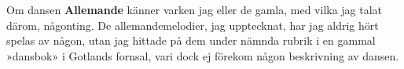 \vspace{0.7cm}
Om dansen \textbf{Allemande} känner varken jag eller de gamla,
med vilka jag talat därom, någonting. De allemandemelodier,
jag upptecknat, har jag aldrig hört spelas av någon, utan jag hittade på dem under nämnda rubrik i en gammal »dansbok» i Gotlands fornsal, vari dock ej förekom någon beskrivning av dansen.
\vspace{0.2cm}
